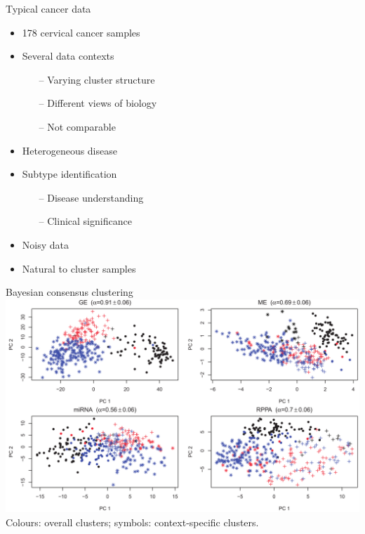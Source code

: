 \documentclass[t, final]{beamer}
\begin{document}
\begin{frame}{}
\begin{columns}[t]
\begin{column}{.32\linewidth}
\begin{block}{Typical cancer data}
  \begin{itemize}
    \item 178 cervical cancer samples
    \item Several data contexts
      \begin{itemize}
        \item[--] Varying cluster structure
        \item[--] Different views of biology
        \item[--] Not comparable
      \end{itemize}
    \item Heterogeneous disease
    \item Subtype identification
      \begin{itemize}
        \item[--] Disease understanding
        \item[--] Clinical significance
      \end{itemize}
    \item Noisy data
    \item Natural to cluster samples
  \end{itemize}
\end{block}

\begin{block}{Bayesian consensus clustering}
  \includegraphics[width=\textwidth]{Figures/BCC-clusters}
  {
    \tiny
    Colours: overall clusters; symbols: context-specific clusters.
  }

\end{block}


\end{column}
\end{columns}
\end{frame}
\end{document}
